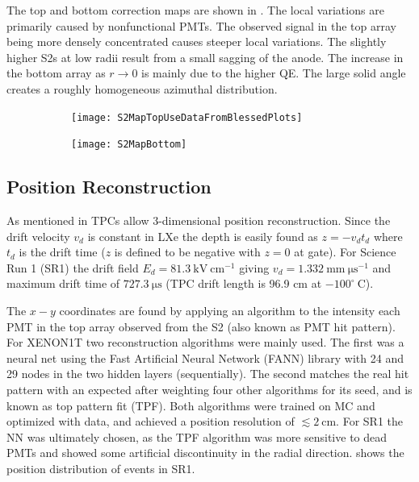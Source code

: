 The top and bottom correction maps are shown in .  The local variations are primarily
caused by nonfunctional PMTs.  The observed signal in the top array being more densely concentrated causes steeper local variations.  The
slightly higher S2s at low radii result from a small sagging of the anode.  The increase in the bottom array as $r \rightarrow 0$ is 
mainly due to the higher QE.  The large solid angle creates a roughly homogeneous azimuthal distribution.

\begin{figure}
    \centering
    \begin{subfigure}[t]{0.45\textwidth}
        \centering
        \texttt{[image: S2MapTopUseDataFromBlessedPlots]}
    \end{subfigure}%
    \begin{subfigure}[t]{0.45\textwidth}
        \centering
        \texttt{[image: S2MapBottom]}
    \end{subfigure}
    \caption{}
	\label{fig:calibrations_s2_maps}
\end{figure}



\subsection{Position Reconstruction}
\label{subsec:calibrations_position_reconstruction}
As mentioned in  TPCs allow 3-dimensional position reconstruction.  Since the drift velocity $v_d$
is constant in LXe the depth is easily found as $z = -v_d t_d$ where $t_d$ is the drift time ($z$ is defined to be negative with
$z = 0$ at gate).  For Science Run 1 (SR1) the drift field $E_d = 81.3\ \mathrm{kV\ cm^{-1}}$ giving
$v_d = 1.332\ \mathrm{mm\ \mu s^{-1}}$ and maximum drift time of $727.3\ \mathrm{\mu s}$ (TPC drift length is 96.9 cm at
$-100^{\circ}\ \mathrm{C}$).

The $x-y$ coordinates are found by applying an algorithm to the intensity each PMT in the top array observed from the S2 (also known as
PMT hit pattern).  For XENON1T two reconstruction algorithms were mainly used.  The first was a neural net using the Fast Artificial
Neural Network (FANN) library with 24 and 29 nodes in the two hidden layers (sequentially).  The second matches the real hit pattern with
an expected after weighting four other algorithms for its seed, and is known as top pattern fit (TPF).  Both algorithms were trained on MC
and optimized with  data, and achieved a position resolution of $\lesssim 2\ \mathrm{cm}$.  For SR1 the NN was ultimately
chosen, as the TPF algorithm was more sensitive to dead PMTs and showed some artificial discontinuity in the radial
direction.   shows the position distribution of events in SR1.

